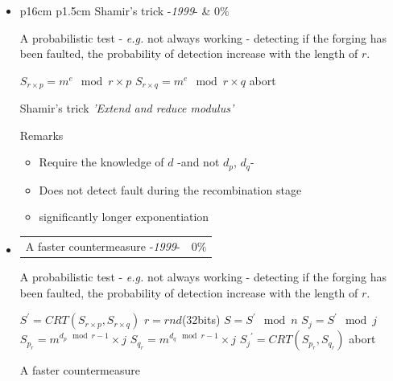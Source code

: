 \begin{itemize}
\item \begin{tabularx}{\linewidth}{ p{16cm} p{1.5cm}}
			Shamir's trick -\textit{1999}-  & $0\%$ \\ 
	  \end{tabularx}
	  \noindent A probabilistic test - \textit{e.g.} not always working - detecting if the 
	  forging has been faulted, the probability of detection increase with the length of $r$.
	  
		\begin{algorithm}[h]
			 $ S_{r \times p}  =  m^e \mod r \times p$ \;
			 $ S_{r \times q}  =  m^e \mod r \times q$ 
			{
			abort				
			}									 
			\;
			\caption{Shamir's trick \textit{'Extend and reduce modulus'} }
		\end{algorithm}
		
		Remarks	
		\begin{itemize}
			\item Require the knowledge of $d$  -and not $d_p$, $d_q$-
			\item Does not detect fault during the recombination stage
			\item significantly longer exponentiation
		\end{itemize}	

\item \begin{tabularx}{\linewidth}{ p{16cm} p{1.5cm}}
			A faster countermeasure -\textit{1999}-  & $0\%$ \\ 
	  \end{tabularx}
	  \noindent A probabilistic test - \textit{e.g.} not always working - detecting if the 
	  forging has been faulted, the probability of detection increase with the length of $r$.
	  
		\begin{algorithm}[h]
			 $ S^{'} = CRT(S_{r \times p}, S_{r \times q} ) $ \;
			 $r=rnd$(32bits) \;
			 $S =S^{'} \mod n$\;
			 $S_j =S^{'} \mod j$\;			 
			 $ S_{p_r}  =  m^{d_p \mod r-1} \times j$ \;
			 $ S_{q_r}  =  m^{d_q \mod r-1} \times j$ \;
			 $ {S_j}^{'} =  CRT(S_{p_r}, S_{q_r} ) $  \;
			{
			abort				
			}									 
			\;
			\caption{A faster countermeasure}
		\end{algorithm}
		

\end{itemize}
